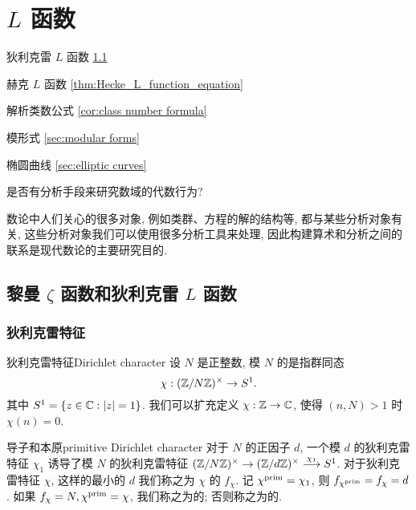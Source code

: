 

\chapter{\texorpdfstring{$L$}{L} 函数}
\begin{introduction}
\item 狄利克雷 $L$ 函数 \ref{sec:Dirichlet L-function}
\item 赫克 $L$ 函数 \ref{thm:Hecke_L_function_equation}
\item 解析类数公式 \ref{cor:class number formula}
\item 模形式 \ref{sec:modular forms}
\item 椭圆曲线 \ref{sec:elliptic curves}
\end{introduction}

\begin{question}{}{}
是否有分析手段来研究数域的代数行为?
\end{question}

数论中人们关心的很多对象, 例如类群、方程的解的结构等, 都与某些分析对象有关, 这些分析对象我们可以使用很多分析工具来处理, 因此构建算术和分析之间的联系是现代数论的主要研究目的.

\section{黎曼 \texorpdfstring{$\zeta$}{ζ} 函数和狄利克雷 \texorpdfstring{$L$}{L} 函数}
\label{sec:Dirichlet L-function}

\subsection{狄利克雷特征}
\begin{definition}{狄利克雷特征}{Dirichlet character}
设 $N$ 是正整数, 模 $N$ 的是指群同态
  \[\chi:({\mathbb{Z}}/N{\mathbb{Z}})^\times\to S^1.\]
其中 $S^1=\left\{z\in{\mathbb{C}}: |z|=1\right\}$.
我们可以扩充定义 $\chi:{\mathbb{Z}}\to{\mathbb{C}}$, 使得 $(n,N)>1$ 时 $\chi(n)=0$.
\end{definition}

\begin{definition}{导子和本原}{primitive Dirichlet character}
对于 $N$ 的正因子 $d$, 一个模 $d$ 的狄利克雷特征 $\chi_1$ 诱导了模 $N$ 的狄利克雷特征 $({\mathbb{Z}}/N{\mathbb{Z}})^\times\to({\mathbb{Z}}/d{\mathbb{Z}})^\times\stackrel{\chi_1}{\longrightarrow} S^1$. 对于狄利克雷特征 $\chi$, 这样的最小的 $d$ 我们称之为 $\chi$ 的 $f_\chi$. 记 $\chi^{\mathrm{prim}}=\chi_1$, 则 $f_{\chi^{\mathrm{prim}}}=f_\chi=d$.
如果 $f_\chi=N, \chi^{\mathrm{prim}}=\chi$, 我们称之为的; 否则称之为的.
\end{definition}

